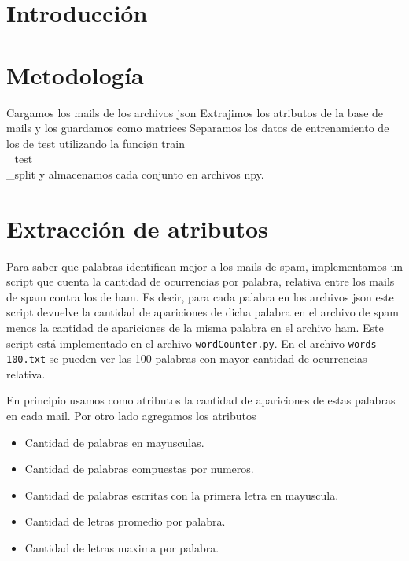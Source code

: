 \documentclass[10pt, a4paper]{article}
\begin{document}
\fecha{\today}



\maketitle
\tableofcontents
\newpage

\section*{Introducción}

\section{Metodología}
Cargamos los mails de los archivos json
Extrajimos los atributos de la base de mails y los guardamos como matrices
Separamos los datos de entrenamiento de los de test utilizando la funciøn train\\_test\\_split y almacenamos cada conjunto en archivos npy.

\section{Extracción de atributos}
Para saber que palabras identifican mejor a los mails de spam, implementamos un script que cuenta la cantidad de ocurrencias por palabra, relativa entre los mails de spam contra los de ham.
Es decir, para cada palabra en los archivos json este script devuelve la cantidad de apariciones de dicha palabra en el archivo de spam menos la cantidad de apariciones de la misma palabra en el archivo ham.
Este script está implementado en el archivo \texttt{wordCounter.py}. En el archivo \texttt{words-100.txt} se pueden ver las 100 palabras con mayor cantidad de ocurrencias relativa.

En principio usamos como atributos la cantidad de apariciones de estas palabras en cada mail. Por otro lado agregamos los atributos

\begin{itemize}
\item Cantidad de palabras en mayusculas.
\item Cantidad de palabras compuestas por numeros.
\item Cantidad de palabras escritas con la primera letra en mayuscula.
\item Cantidad de letras promedio por palabra. 
\item Cantidad de letras maxima por palabra. 
\end{itemize}
\end{document}
